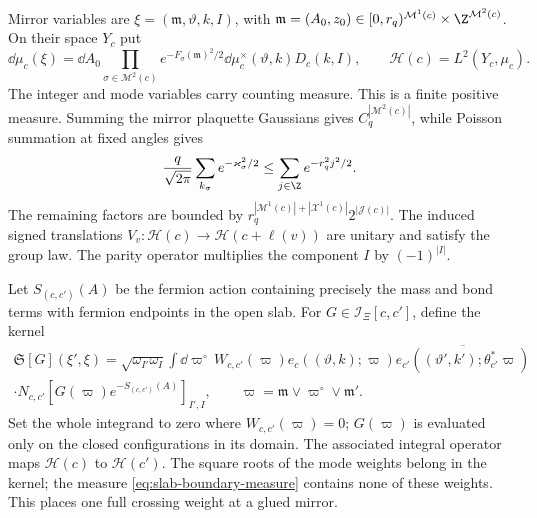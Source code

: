Mirror variables are
$\xi=(\mathfrak m,\vartheta,k,I)$, with
$\mathfrak m=(A_0,z_0)\in[0,r_q)^{\mathcal M^1(c)}
\times\Z^{\mathcal M^2(c)}$. On their space $Y_c$ put
\begin{equation}\label{eq:slab-boundary-measure}
 \dd\mu_c(\xi)=\dd A_0
      \prod_{\sigma\in\mathcal M^2(c)}e^{-F_\sigma(\mathfrak m)^2/2}
                  \dd\mu_c^\times(\vartheta,k)D_c(k,I),
 \qquad \mathcal H(c)=L^2(Y_c,\mu_c).
\end{equation}
The integer and mode variables carry counting measure. This is a
finite positive measure. Summing the mirror plaquette Gaussians gives
$C_q^{|\mathcal M^2(c)|}$, while Poisson summation at fixed angles
gives
\[
 \frac q{\sqrt{2\pi}}\sum_{k_\sigma}e^{-\varkappa_\sigma^2/2}
 \le\sum_{j\in\Z}e^{-r_q^2j^2/2}.
\]
The remaining factors are bounded by
$r_q^{|\mathcal M^1(c)|+|\mathcal X^1(c)|}2^{|\mathcal J(c)|}$.
The induced signed translations $V_v:\mathcal H(c)\to
\mathcal H(c+\ell(v))$ are unitary and satisfy the group law. The
parity operator multiplies the component $I$ by $(-1)^{|I|}$.

Let $S_{(c,c')}(A)$ be the fermion action containing precisely the mass
and bond terms with fermion endpoints in the open slab. For
$G\in\mathcal I_\Xi[c,c']$, define the kernel
\begin{multline}\label{eq:slab-kernel}
 \mathfrak S[G](\xi',\xi)=\sqrt{\omega_{I'}\omega_I}
      \int\dd\varpi^\circ\,W_{c,c'}(\varpi)
      e_c((\vartheta,k);\varpi)
       \overline{e_{c'}((\vartheta',k');\theta_{c'}^*\varpi)}
       \\
       \cdot N_{c,c'}[G(\varpi)e^{-S_{(c,c')}(A)}]_{I',I},
       \qquad \varpi=\mathfrak m\vee\varpi^\circ\vee\mathfrak m'.
\end{multline}
Set the whole integrand to zero where $W_{c,c'}(\varpi)=0$;
$G(\varpi)$ is evaluated only on the closed configurations in its
domain.
The associated integral operator maps $\mathcal H(c)$ to
$\mathcal H(c')$. The square roots of the mode weights belong in the
kernel; the measure \eqref{eq:slab-boundary-measure} contains none of
these weights. This places one full crossing weight at a glued mirror.

